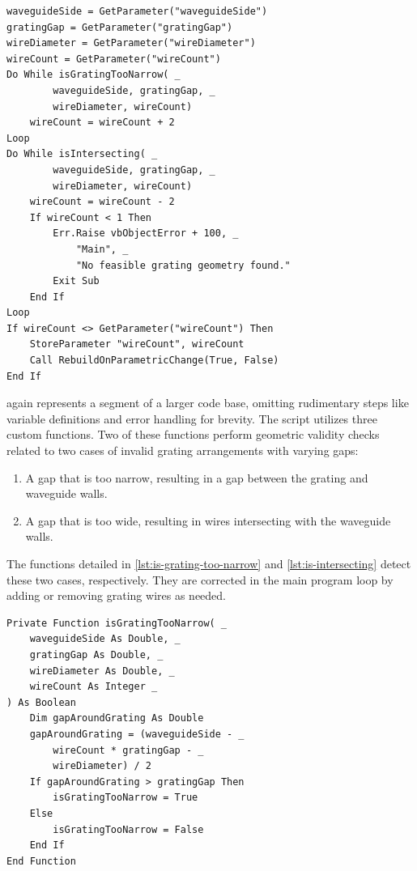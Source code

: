 \documentclass[11pt,a4paper,twoside,openany]{report}
\begin{document}
\begin{lstlisting}[caption={Grating adjustment script}, label={lst:grating-adjustment}, language=VBScript]
waveguideSide = GetParameter("waveguideSide")
gratingGap = GetParameter("gratingGap")
wireDiameter = GetParameter("wireDiameter")
wireCount = GetParameter("wireCount")
Do While isGratingTooNarrow( _
        waveguideSide, gratingGap, _
        wireDiameter, wireCount)
    wireCount = wireCount + 2
Loop
Do While isIntersecting( _
        waveguideSide, gratingGap, _
        wireDiameter, wireCount)
    wireCount = wireCount - 2
    If wireCount < 1 Then
        Err.Raise vbObjectError + 100, _
            "Main", _
            "No feasible grating geometry found."
        Exit Sub
    End If
Loop
If wireCount <> GetParameter("wireCount") Then
    StoreParameter "wireCount", wireCount
    Call RebuildOnParametricChange(True, False)
End If
\end{lstlisting}

 again represents a segment of a larger code base, omitting rudimentary steps like variable definitions and error handling for brevity. The script utilizes three custom functions. Two of these functions perform geometric validity checks related to two cases of invalid grating arrangements with varying gaps:
\begin{enumerate}[label=(\alph*)]
    \item A gap that is too narrow, resulting in a gap between the grating and waveguide walls.
    \item A gap that is too wide, resulting in wires intersecting with the waveguide walls.
\end{enumerate}
The functions detailed in \cref{lst:is-grating-too-narrow} and \cref{lst:is-intersecting} detect these two cases, respectively. They are corrected in the main program loop by adding or removing grating wires as needed.

\begin{lstlisting}[caption={Check for a gap around the grating}, label={lst:is-grating-too-narrow}, language=VBScript]
Private Function isGratingTooNarrow( _
    waveguideSide As Double, _
    gratingGap As Double, _
    wireDiameter As Double, _
    wireCount As Integer _
) As Boolean
    Dim gapAroundGrating As Double
    gapAroundGrating = (waveguideSide - _
        wireCount * gratingGap - _
        wireDiameter) / 2
    If gapAroundGrating > gratingGap Then
        isGratingTooNarrow = True
    Else
        isGratingTooNarrow = False
    End If
End Function
\end{lstlisting}
\end{document}

